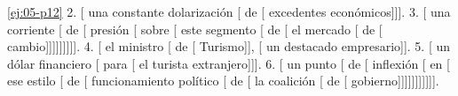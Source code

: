 \begin{solucion}{\ref{ej:05-p12}}
2. [ una constante dolarización [
de [ excedentes económicos]]].
3. [ una corriente [ de
[ presión [ sobre [
este segmento [ de [
el mercado [ de [
cambio]]]]]]]]].
4. [ el ministro [ de
[ Turismo]], [ un destacado
empresario]].
5. [ un dólar financiero [
para [ el turista
extranjero]]].
6. [ un punto [ de [
inflexión [ en [ ese
estilo [ de [ funcionamiento
político [ de [ la
coalición [ de [
gobierno]]]]]]]]]]].
\end{solucion}
